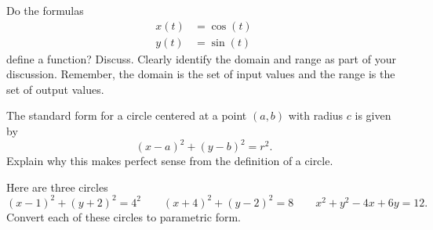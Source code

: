 \begin{prob}
Do the formulas 
\begin{align*}
x(t) &= \cos(t)\\
y(t) &= \sin(t) 
\end{align*}
define a function? Discuss. Clearly identify the
domain and range as part of your discussion.  Remember, the domain is the set of input values and the range is the set of output values.  
\end{prob}


\begin{prob} 
The standard form for a circle centered at a point $(a,b)$ with radius $c$ is given by
\[
(x-a)^2 + (y-b)^2 = r^2.
\]
Explain why this makes perfect sense from the definition of a circle. 
\end{prob} 


\begin{prob}
Here are three circles
\[
(x-1)^2 + (y+2)^2 = 4^2 \qquad (x+4)^2 + (y-2)^2 = 8 \qquad x^2+y^2 -4x+6y= 12.
\]
Convert each of these circles to parametric form.
\end{prob}




